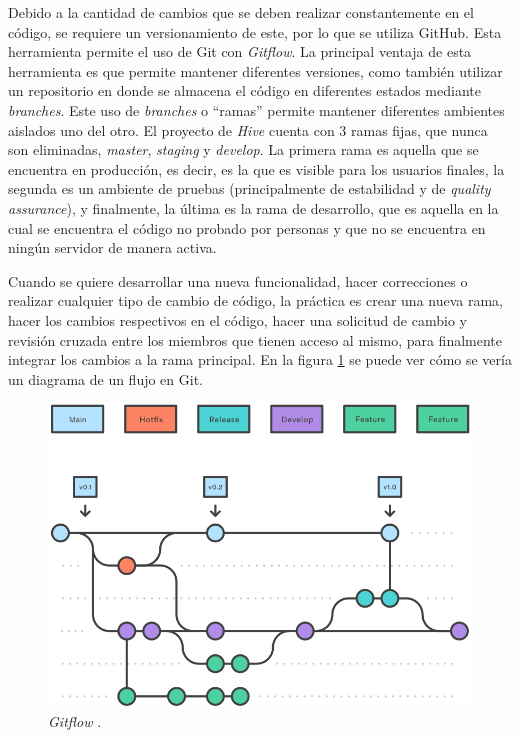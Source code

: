     Debido a la cantidad de cambios que se deben realizar constantemente en el código, se requiere un versionamiento de este, por lo que se utiliza GitHub. Esta herramienta permite el uso de Git con \textit{Gitflow}. La principal ventaja de esta herramienta es que permite mantener diferentes versiones, como también utilizar un repositorio en donde se almacena el código en diferentes estados mediante \textit{branches}. Este uso de \textit{branches} o ``ramas'' permite mantener diferentes ambientes aislados uno del otro. El proyecto de \textit{Hive} cuenta con 3 ramas fijas, que nunca son eliminadas, \textit{master}, \textit{staging} y \textit{develop}. La primera rama es aquella que se encuentra en producción, es decir, es la que es visible para los usuarios finales, la segunda es un ambiente de pruebas (principalmente de estabilidad y de \textit{quality assurance}), y finalmente, la última es la rama de desarrollo, que es aquella en la cual se encuentra el código no probado por personas y que no se encuentra en ningún servidor de manera activa. 
    
    Cuando se quiere desarrollar una nueva funcionalidad, hacer correcciones o realizar cualquier tipo de cambio de código, la práctica es crear una nueva rama, hacer los cambios respectivos en el código, hacer una solicitud de cambio y revisión cruzada entre los miembros que tienen acceso al mismo, para finalmente integrar los cambios a la rama principal. En la figura \ref{fig:gitflow_diagram} se puede ver cómo se vería un diagrama de un flujo en Git.
    
    \begin{figure}
        \centering
        \includegraphics[width=0.65\linewidth]{figures/gitflow.png}
        \caption{\textit{Gitflow} \protect\cite{gitflow_diagram}.}
        \label{fig:gitflow_diagram}
    \end{figure}
    
